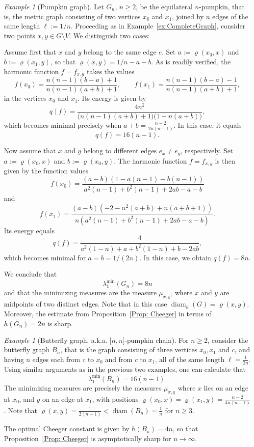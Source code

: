 \documentclass[reqno]{amsart}
\theoremstyle{plain}
\theoremstyle{definition}
\theoremstyle{remark}
\newtheorem{ex}[thm]{Example}
\numberwithin{equation}{section}
\newcommand{\diam}{\operatorname{diam}}
\begin{document}
\begin{ex}[Pumpkin graph] \label{ex: Pumpkin}
Let $G_n$, $n \ge  2$, be the equilateral $n$-pumpkin, that is, the metric graph consisting of two vertices $x_0$ and $x_1$, joined by $n$ edges of the same length $\ell := 1/n$. Proceeding as in Example~\ref{ex:CompleteGraph}, consider two points $x,y \in G  \setminus V$. We distinguish two cases:
	
	Assume first that $x$ and $y$ belong to the same edge $e$. Set $a := \varrho(x_0,x)$ and $b := \varrho(x_1, y)$, so that $\varrho(x,y) = 1/n -a-b$. 
	As is readily verified, the harmonic function $f=f_{x,y}$ takes the values
	\[
	f(x_0) = \frac{n(n-1)(b-a) + 1 }{n(n-1)(a+b) + 1}, \qquad f(x_1) = \frac{n(n-1)(b-a) - 1}{n(n-1)(a+b) + 1}, 
	\]
	in the vertices $x_0$ and $x_1$. Its energy is given by
	\[
	q(f) = \frac{4n^2}{ \big (n(n-1)(a+b) + 1 \big ) \big (1-n (a+b) \big )},
	\]
	which becomes minimal precisely when $a+b=\frac{n-2}{2n(n-1)}$. In this case, it equals 
	\[
	q(f) = 16(n-1). 
	\]
	
	Now assume that $x$ and $y$ belong to different edges $e_x \neq  e_y$, respectively. Set $a:= \varrho(x_0 ,x)$ and $b := \varrho(x_0,y)$. The harmonic function $f = f_{x,y}$ is then given by the function values 
	\[
	f(x_0) = \frac{(a-b)(1-a(n-1)-b(n-1))}{a^2(n-1) + b^2(n-1) + 2ab - a - b}
	\]
	and
	\[
	f(x_1) = \frac{(a-b)(-2-n^2(a+b)+n(a+b+1))}{n(a^2(n-1) + b^2(n-1) + 2ab - a - b)}.
	\]
	Its energy equals
	\[
	q(f) = \frac{4}{a^2(1-n) +a +b^2(1-n) +b -2ab },
	\]
	which becomes minimal for $a=b=1/(2n)$. In this case, we obtain $q(f) = 8n$.
	
	
	We conclude that
	\[
	\lambda_1^{\min}(G_n) = 8n
	\]
	and that the minimizing measures are the measure $\mu_{x,y}$, where $x$ and $y$ are midpoints of two distinct edges. Note that in this case $\diam_\varrho(G) = \varrho(x,y)$. Moreover, the estimate from Proposition~\ref{Prop: Cheeger} in terms of $h(G_n) = 2n$ is sharp.
\end{ex}


\begin{ex}[Butterfly graph, a.k.a. ${[}n,  n{]}$-pumpkin chain]
For $n \ge 2$, consider the butterfly graph $B_n$,  that is the graph consisting  of three vertices $x_0, x_1$ and $c$, and having $n$ edges each from $c$ to $x_0$ and from $c$ to $x_1$, all of the same length $\ell = \frac{1}{2n}$. Using similar arguments as in the previous two examples, one can calculate that
	\[
	\lambda_1^{\min} (B_n) =16(n-1).
	\]
	The minimizing measures are precisely the measures $\mu_{x,y}$ where $x$ lies on an edge at $x_0$, and $y$ on an edge at $x_1$, with positions $\varrho(x_0,x) = \varrho(x_1, y) =   \frac{n-2}{4n(n-1)}$. Note that $\varrho(x,y) = \frac{1}{2(n-1)} < \diam(B_n) = \frac{1}{n}$ for $n \ge 3$.
	
	The optimal Cheeger constant is given by $h(B_n) = 4n$, so that Proposition~\ref{Prop: Cheeger} is asymptotically sharp for $n\to\infty$. 
\end{ex}
\end{document}
